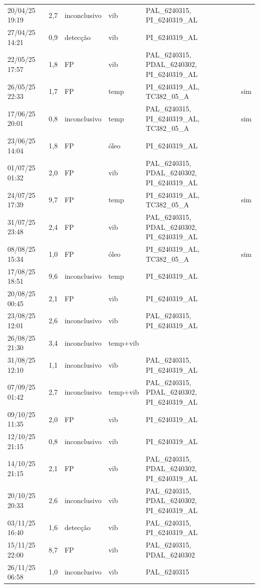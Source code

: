 \begin{longtable}{llll >{\raggedright\arraybackslash}p{6.2cm} l}
20/04/25 19:19 & 2,7 & inconclusivo & vib & PAL\_6240315, PI\_6240319\_AL &  \\
27/04/25 14:21 & 0,9 & detecção & vib & PI\_6240319\_AL &  \\
22/05/25 17:57 & 1,8 & FP & vib & PAL\_6240315, PDAL\_6240302, PI\_6240319\_AL &  \\
26/05/25 22:33 & 1,7 & FP & temp & PI\_6240319\_AL, TC382\_05\_A & sim \\
17/06/25 20:01 & 0,8 & inconclusivo & temp & PAL\_6240315, PI\_6240319\_AL, TC382\_05\_A & sim \\
23/06/25 14:04 & 1,8 & FP & óleo & PI\_6240319\_AL &  \\
01/07/25 01:32 & 2,0 & FP & vib & PAL\_6240315, PDAL\_6240302, PI\_6240319\_AL &  \\
24/07/25 17:39 & 9,7 & FP & temp & PI\_6240319\_AL, TC382\_05\_A & sim \\
31/07/25 23:48 & 2,4 & FP & vib & PAL\_6240315, PDAL\_6240302, PI\_6240319\_AL &  \\
08/08/25 15:34 & 1,0 & FP & óleo & PI\_6240319\_AL, TC382\_05\_A & sim \\
17/08/25 18:51 & 9,6 & inconclusivo & temp & PI\_6240319\_AL &  \\
20/08/25 00:45 & 2,1 & FP & vib & PI\_6240319\_AL &  \\
23/08/25 12:01 & 2,6 & inconclusivo & vib & PAL\_6240315, PI\_6240319\_AL &  \\
26/08/25 21:30 & 3,4 & inconclusivo & temp+vib &  &  \\
31/08/25 12:10 & 1,1 & inconclusivo & vib & PAL\_6240315, PI\_6240319\_AL &  \\
07/09/25 01:42 & 2,7 & inconclusivo & temp+vib & PAL\_6240315, PDAL\_6240302, PI\_6240319\_AL &  \\
09/10/25 11:35 & 2,0 & FP & vib & PI\_6240319\_AL &  \\
12/10/25 21:15 & 0,8 & inconclusivo & vib & PI\_6240319\_AL &  \\
14/10/25 21:15 & 2,1 & FP & vib & PAL\_6240315, PDAL\_6240302, PI\_6240319\_AL &  \\
20/10/25 20:33 & 2,6 & inconclusivo & vib & PAL\_6240315, PDAL\_6240302, PI\_6240319\_AL &  \\
03/11/25 16:40 & 1,6 & detecção & vib & PAL\_6240315, PI\_6240319\_AL &  \\
15/11/25 22:00 & 8,7 & FP & vib & PAL\_6240315, PDAL\_6240302 &  \\
26/11/25 06:58 & 1,0 & inconclusivo & vib & PAL\_6240315 &  \\

\end{longtable}
